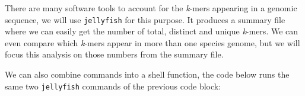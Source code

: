 \documentclass[10pt,a4paper,]{article}
\newenvironment{Shaded}{}{}
\newcommand{\CommentTok}[1]{\textcolor[rgb]{0.38,0.63,0.69}{\textit{#1}}}
\newcommand{\ExtensionTok}[1]{#1}
\newcommand{\FunctionTok}[1]{\textcolor[rgb]{0.02,0.16,0.49}{#1}}
\newcommand{\KeywordTok}[1]{\textcolor[rgb]{0.00,0.44,0.13}{\textbf{#1}}}
\newcommand{\NormalTok}[1]{#1}
\newcommand{\VariableTok}[1]{\textcolor[rgb]{0.10,0.09,0.49}{#1}}
\begin{document}
There are many software tools to account for the \emph{k}-mers appearing
in a genomic sequence, we will use \texttt{jellyfish} for this purpose.
It produces a summary file where we can easily get the number of total,
distinct and unique \emph{k}-mers. We can even compare which
\emph{k}-mers appear in more than one species genome, but we will focus
this analysis on those numbers from the summary file.

\begin{Shaded}
\end{Shaded}

We can also combine commands into a shell function, the code below runs
the same two \texttt{jellyfish} commands of the previous code block:
\end{document}
